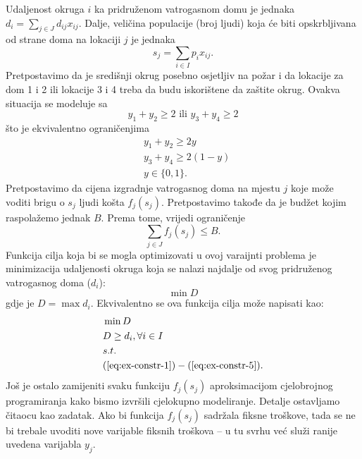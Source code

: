\documentclass[a4paper, utf8, 11pt, colorlinks]{book}
\begin{document}
Udaljenost okruga $i$ ka pridruženom vatrogasnom domu je jednaka $d_i = \sum_{j \in J} d_{ij}x_{ij} $. Dalje, veličina populacije (broj ljudi) koja će biti opskrbljivana od strane doma na lokaciji $j$ je jednaka 
\begin{equation}\label{eq:ex-constr-3}
    s_j = \sum_{i \in I} p_i x_{ij}. 
\end{equation}
Pretpostavimo da je središnji okrug posebno osjetljiv na požar i da lokacije za dom  1 i 2 ili lokacije 3 i 4 treba  da budu iskorištene da zaštite okrug. Ovakva situacija se modeluje sa
\begin{equation*} 
    y_1 + y_2 \geq 2 \mbox{ ili } y_3 + y_4 \geq 2
\end{equation*}
što je ekvivalentno ograničenjima 
\begin{align}
    &y_1 + y_2 \geq 2 y \nonumber \\
    &y_3 + y_4 \geq 2 (1-y) \nonumber \\
    & y \in \{0, 1 \}.\label{eq:ex-constr-4}
\end{align}
Pretpostavimo da cijena izgradnje vatrogasnog doma na mjestu $j$ koje može voditi brigu o $s_j$ ljudi košta $f_j(s_j)$. Pretpostavimo takođe da je budžet kojim raspolažemo jednak $B$. Prema tome, vrijedi ograničenje
\begin{equation}\label{eq:ex-constr-5}
     \sum_{j \in J} f_j(s_j) \leq B.
\end{equation}
 Funkcija cilja koja bi se mogla optimizovati u ovoj varaijnti problema je minimizacija udaljenosti 
 okruga koja se nalazi najdalje od svog pridruženog vatrogasnog doma ($d_i$):
      $$\min D $$
 gdje je $D= \max d_i$. Ekvivalentno se ova funkcija cilja može napisati kao:
 \begin{align*}
      &\min D \\
      & D \geq d_i,  \forall i \in I \\
      &  {s.t. } \\ 
      &(\ref{eq:ex-constr-1})-(\ref{eq:ex-constr-5}).
 \end{align*}
 Još je ostalo zamijeniti svaku funkciju $f_j (s_j)$ aproksimacijom cjelobrojnog programiranja kako bismo izvršili cjelokupno modeliranje. Detalje ostavljamo čitaocu kao zadatak. Ako bi funkcija $f_j (s_j)$ sadržala fiksne troškove, tada se ne bi trebale uvoditi nove varijable fiksnih troškova -- u tu svrhu već služi ranije uvedena varijabla $y_j$. 
 
\end{document}
